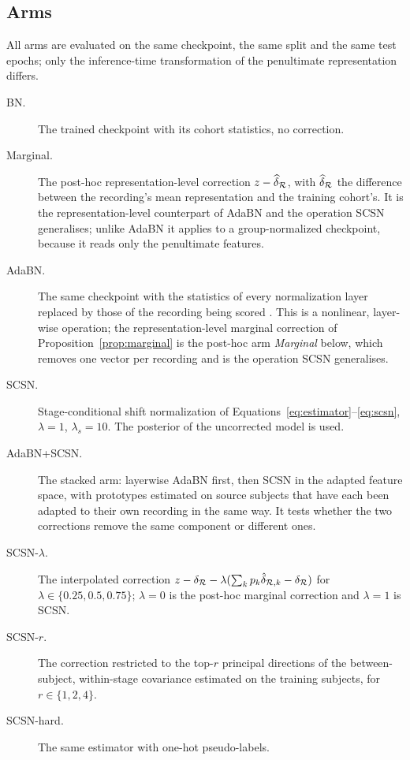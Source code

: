 \subsection{Arms}

All arms are evaluated on the same checkpoint, the same split and the same test
epochs; only the inference-time transformation of the penultimate
representation differs.

\begin{description}
  \item[BN.] The trained checkpoint with its cohort statistics, no correction.
  \item[Marginal.] The post-hoc representation-level correction
  $z-\widehat{\delta}_{\mathcal{R}}$, with $\widehat{\delta}_{\mathcal{R}}$ the difference between the
  recording's mean representation and the training cohort's. It is the
  representation-level counterpart of AdaBN and the operation SCSN
  generalises; unlike AdaBN it applies to a group-normalized checkpoint,
  because it reads only the penultimate features.
  \item[AdaBN.] The same checkpoint with the statistics of every
  normalization layer replaced by those of the recording being scored
  \citep{li2018adabn}. This is a nonlinear, layer-wise operation; the
  representation-level marginal correction of
  Proposition~\ref{prop:marginal} is the post-hoc arm
  \emph{Marginal} below, which removes one vector per recording and is the
  operation SCSN generalises.
  \item[SCSN.] Stage-conditional shift normalization of
  Equations~\eqref{eq:estimator}--\eqref{eq:scsn}, $\lambda=1$,
  $\lambda_s=10$. The posterior of the uncorrected model is used.
  \item[AdaBN+SCSN.] The stacked arm: layerwise AdaBN first, then SCSN in the
  adapted feature space, with prototypes estimated on source subjects that
  have each been adapted to their own recording in the same way. It tests
  whether the two corrections remove the same component or different ones.
  \item[SCSN-$\lambda$.] The interpolated correction
  $z-\delta_{\mathcal{R}}-\lambda(\sum_k p_k\hat\delta_{\mathcal{R},k}-\delta_{\mathcal{R}})$ for
  $\lambda\in\{0.25,0.5,0.75\}$; $\lambda=0$ is the post-hoc marginal
  correction and $\lambda=1$ is SCSN.
  \item[SCSN-$r$.] The correction restricted to the top-$r$ principal
  directions of the between-subject, within-stage covariance estimated on the
  training subjects, for $r\in\{1,2,4\}$.
  \item[SCSN-hard.] The same estimator with one-hot pseudo-labels.

\end{description}
